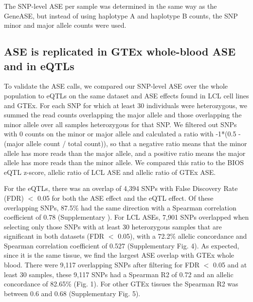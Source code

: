 The SNP-level ASE per sample was determined in the same way as the GeneASE, but instead of using haplotype A and haplotype B counts, the SNP minor and major allele counts were used.

\subsection{ASE is replicated in GTEx whole-blood ASE and in eQTLs}
To validate the ASE calls, we compared our SNP-level ASE over the whole population to eQTLs on the same dataset and ASE effects found in LCL cell lines\cite{deelenCallingGenotypesPublic2015a} and GTEx\cite{pirinenAssessingAllelespecificExpression2015a}. For each SNP for which at least 30 individuals were heterozygous, we summed the read counts overlapping the major allele and those overlapping the minor allele over all samples heterozygous for that SNP. We filtered out SNPs with 0 counts on the minor or major allele and calculated a ratio with -1*(0.5 - (major allele count / total count)), so that a negative ratio means that the minor allele has more reads than the major allele, and a positive ratio means the major allele has more reads than the minor allele. We compared this ratio to the BIOS eQTL z-score, allelic ratio of LCL ASE and allelic ratio of GTEx ASE. 

For the eQTLs, there was an overlap of 4,394 SNPs with False Discovery Rate (FDR) $<$ 0.05 for both the ASE effect and the eQTL effect. Of these overlapping SNPs, 87.5\% had the same direction with a Spearman correlation coefficient of 0.78 (Supplementary ). For LCL ASEs, 7,901 SNPs overlapped when selecting only those SNPs with at least 30 heterozygous samples that are significant in both datasets (FDR $<$ 0.05), with a 72.2\% allelic concordance and Spearman correlation coefficient of 0.527 (Supplementary Fig. 4). As expected, since it is the same tissue, we find the largest ASE overlap with GTEx whole blood. There were 9,117 overlapping SNPs after filtering for FDR $<$ 0.05 and at least 30 samples, these 9,117 SNPs had a Spearman R2 of 0.72 and an allelic concordance of 82.65\% (Fig. 1). For other GTEx tissues the Spearman R2 was between 0.6 and 0.68 (Supplementary Fig. 5).

